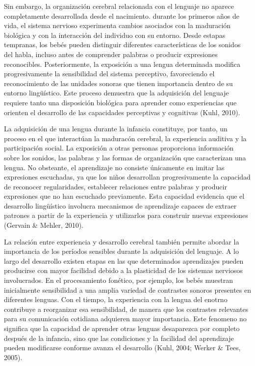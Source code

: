 \documentclass[12pt]{article}
\begin{document}
Sin embargo, la organización cerebral relacionada con el lenguaje no aparece completamente desarrollada desde el nacimiento. durante los primeros años de vida, el sistema nervioso experimenta cambios asociados con la maduración biológica y con la interacción del individuo con su entorno. Desde estapas tempranas, los bebés pueden distinguir diferentes características de los sonidos del habla, incluso antes de comprender palabras o producir expresiones reconocibles. Posteriormente, la exposición a una lengua determinada modifica progresivamente la sensibilidad del sistema perceptivo, favoreciendo el reconocimiento de las unidades sonoras que tienen importancia dentro de su entorno lingüístico. Este proceso demuestra que la adquisición del lenguaje requiere tanto una disposición biológica para aprender como experiencias que orienten el desarrollo de las capacidades perceptivas y cognitivas (Kuhl, 2010).

La adquisición de una lengua durante la infancia constituye, por tanto, un proceso en el que interactúan la maduracón cerebral, la experiencia auditiva y la participación social. La exposición a otras personas proporciona información sobre los sonidos, las palabras y las formas de organización que caracterizan una lengua. No obsteante, el aprendizaje no consiste únicamente en imitar las expresiones escuchadas, ya que los niños desarrollan progresivamente la capacidad de reconocer regularidades, establecer relaciones entre palabras y producir expresiones que no han escuchado previamente. Esta capacidad evidencia que el desarrollo lingüístico involucra mecanismos de aprendizaje capaces de extraer patrones a partir de la experiencia y utilizarlos para construir nuevas expresiones (Gervain \& Mehler, 2010).

La relación entre experiencia y desarrollo cerebral también permite abordar la importancia de los períodos sensibles durante la adquisición del lenguaje. A lo largo del desarrollo existen etapas en las que determinados aprendizajes pueden producirse con mayor facilidad debido a la plasticidad de los sistemas nerviosos involucrados. En el procesamiento fonético, por ejemplo, los bebés muestran inicialmente sensibilidad a una amplia variedad de contrastes sonoros presentes en diferentes lenguas. Con el tiempo, la experiencia con la lengua del enotrno contribuye a reorganizar esa sensibilidad, de manera que los contrastes relevantes para su comunicación cotidiana adquieren mayor importancia. Este fenomeno no significa que la capacidad de aprender otras lenguas desaparezca por completo después de la infancia, sino que las condiciones y la facilidad del aprendizaje pueden modificarse conforme avanza el desarrollo (Kuhl, 2004; Werker \& Tees, 2005).
\end{document}
